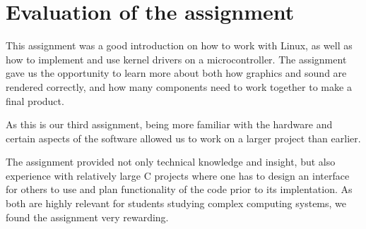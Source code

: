 \section{Evaluation of the assignment}

This assignment was a good introduction on how to work with Linux, as
well as how to implement and use kernel drivers on a microcontroller.
The assignment gave us the opportunity to learn more about both how
graphics and sound are rendered correctly, and how many components need
to work together to make a final product.

As this is our third assignment, being more familiar with the hardware
and certain aspects of the software allowed us to work on a larger
project than earlier.

The assignment provided not only technical knowledge and insight, but
also experience with relatively large C projects where one has to design
an interface for others to use and plan functionality of the code prior
to its implentation. As both are highly relevant for students studying
complex computing systems, we found the assignment very rewarding.
